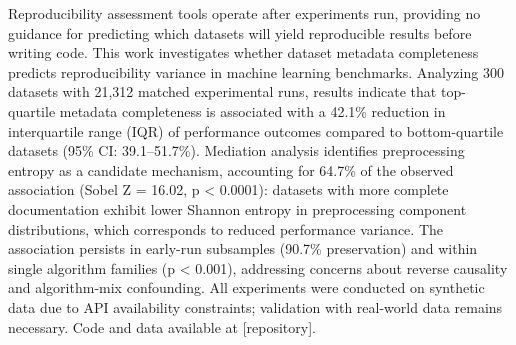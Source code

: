 
Reproducibility assessment tools operate after experiments run, providing no guidance for predicting which datasets will yield reproducible results before writing code. This work investigates whether dataset metadata completeness predicts reproducibility variance in machine learning benchmarks. Analyzing 300 datasets with 21,312 matched experimental runs, results indicate that top-quartile metadata completeness is associated with a 42.1\% reduction in interquartile range (IQR) of performance outcomes compared to bottom-quartile datasets (95\% CI: 39.1--51.7\%). Mediation analysis identifies preprocessing entropy as a candidate mechanism, accounting for 64.7\% of the observed association (Sobel Z = 16.02, p < 0.0001): datasets with more complete documentation exhibit lower Shannon entropy in preprocessing component distributions, which corresponds to reduced performance variance. The association persists in early-run subsamples (90.7\% preservation) and within single algorithm families (p < 0.001), addressing concerns about reverse causality and algorithm-mix confounding. All experiments were conducted on synthetic data due to API availability constraints; validation with real-world data remains necessary. Code and data available at [repository].

